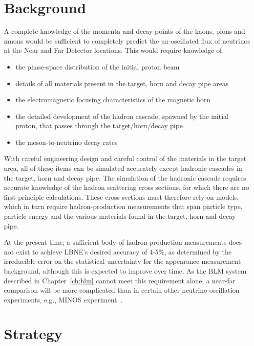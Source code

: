 \section{Background}
A complete knowledge of the momenta and decay points of the kaons, pions and muons would be sufficient to completely predict the un-oscillated flux of neutrinos at the Near and Far Detector
locations. This would require knowledge of:

\begin{itemize}
\item the phase-space distribution of the initial proton beam
\item details of all materials present in the target, horn and decay pipe areas
\item  the electromagnetic focusing characteristics of the magnetic horn
\item the detailed development of the hadron cascade, spawned by the
initial proton, that passes through the target/horn/decay pipe
\item the meson-to-neutrino decay rates
\end{itemize}

With careful engineering design and careful control of the materials in the
target area, all of these items can be simulated accurately except
hadronic cascades in the target, horn and decay
pipe. The simulation of the hadronic cascade requires accurate knowledge of the 
hadron scattering cross sections, for which there are no first-principle
calculations. These cross sections must therefore rely on models, which in
turn require hadron-production measurements that span particle type,
particle energy and the various materials found in the target, horn
and decay pipe. 

 At the present time, a sufficient body of hadron-production
measurements does not exist to achieve LBNE's desired accuracy of 4-5\%, as determined by the irreducible 
error on the statistical uncertainty for the appearance-measurement background, although this is expected to improve over time. 
As the BLM system described in Chapter~\ref{ch:blm} cannot meet this requirement alone, a near-far comparison will be more complicated than in certain other neutrino-oscillation experiments, e.g.,  MINOS experiment~\cite{gnumi-validation}. 

\section{Strategy}

